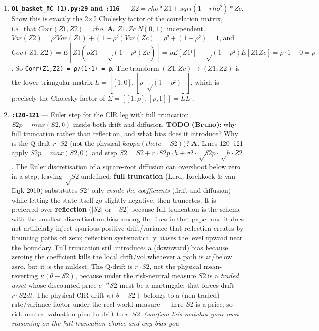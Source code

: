 \documentclass[
  11pt,
]{article}
\begin{document}
\begin{enumerate}
\def\labelenumi{\arabic{enumi}.}
\setcounter{enumi}{8}
\item
  \textbf{\texttt{Q1\_basket\_MC\ (1).py:29} and \texttt{:116}} ---
  \(Z2 = rho*Z1 + sqrt(1-rho^2)*Zc\). Show this is exactly the 2×2
  Cholesky factor of the correlation matrix, i.e.~that
  \(Corr(Z1,Z2)=rho\). \textbf{A.} \(Z1, Zc ~ N(0,1)\) independent.
  \(Var(Z2) = ρ²Var(Z1) + (1−ρ²)Var(Zc) = ρ² + (1−ρ²) = 1\), and
  \(Cov(Z1,Z2) = E[Z1(ρZ1 + √(1−ρ²)Zc)] = ρE[Z1²] + √(1−ρ²)E[Z1 Zc] = ρ·1 + 0 = ρ\).
  So \texttt{Corr(Z1,Z2)\ =\ ρ/(1·1)\ =\ ρ}. The transform
  \((Z1,Zc) ↦ (Z1,Z2)\) is the lower-triangular matrix
  \(L = [[1,0],[ρ,√(1−ρ²)]]\), which is precisely the Cholesky factor of
  \(Σ = [[1,ρ],[ρ,1]] = L Lᵀ\).
\item
  \textbf{\texttt{:120-121}} --- Euler step for the CIR leg with full
  truncation \(S2p = max(S2,0)\) inside both drift and diffusion.
  \textbf{TODO (Bruno):} why full truncation rather than reflection, and
  what bias does it introduce? Why is the Q-drift \(r·S2\) (not the
  physical \(kappa(theta-S2)\))? \textbf{A.} Lines 120--121 apply
  \(S2p = max(S2,0)\) and step \(S2 = S2 + r·S2p·h + σ2·√S2p·√h·Z2\).
  The Euler discretisation of a square-root diffusion can overshoot
  below zero in a step, leaving \(√S2\) undefined; \textbf{full
  truncation} (Lord, Koekkoek \& van Dijk 2010) substitutes \(S2⁺\) only
  \emph{inside the coefficients} (drift and diffusion) while letting the
  state itself go slightly negative, then truncates. It is preferred
  over \textbf{reflection} (\(|S2|\) or \(−S2\)) because full truncation
  is the scheme with the smallest discretisation bias among the fixes in
  that paper and it does not artificially inject spurious positive
  drift/variance that reflection creates by bouncing paths off zero;
  reflection systematically biases the level upward near the boundary.
  Full truncation still introduces a (downward) bias because zeroing the
  coefficient kills the local drift/vol whenever a path is at/below
  zero, but it is the mildest. The Q-drift is \(r·S2\), not the physical
  mean-reverting \(κ(θ−S2)\), because under the risk-neutral measure
  \(S2\) is a \emph{traded asset} whose discounted price \(e^{−rt}S2\)
  must be a martingale; that forces drift \(r·S2 dt\). The physical CIR
  drift \(κ(θ−S2)\) belongs to a (non-traded) rate/variance factor under
  the real-world measure --- here \(S2\) is a price, so risk-neutral
  valuation pins its drift to \(r·S2\). \emph{(confirm this matches your
  own reasoning on the full-truncation choice and any bias you
}
\end{enumerate}
\end{document}
